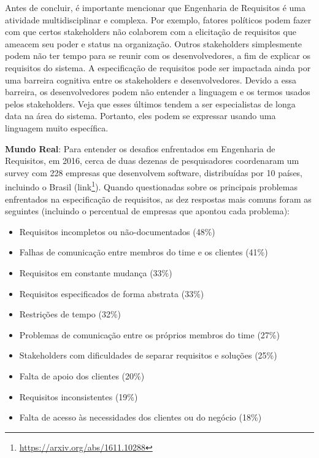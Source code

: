 \documentclass[
  11pt,
  twoside]{book}
\DeclareRobustCommand{\href}[2]{#2\footnote{\url{#1}}}
\newenvironment{esmbox}{\centering \vspace{1.5ex} \begin{tcolorbox}[breakable, colback=backcolor, width=4.9in]}{\end{tcolorbox} \vspace{1.5ex}}
\begin{document}
Antes de concluir, é importante mencionar que Engenharia de Requisitos é
uma atividade multidisciplinar e complexa. Por exemplo, fatores
políticos podem fazer com que certos stakeholders não colaborem com a
elicitação de requisitos que ameacem seu poder e status na organização.
Outros stakeholders simplesmente podem não ter tempo para se reunir com
os desenvolvedores, a fim de explicar os requisitos do sistema. A
especificação de requisitos pode ser impactada ainda por uma barreira
cognitiva entre os stakeholders e desenvolvedores. Devido a essa
barreira, os desenvolvedores podem não entender a linguagem e os termos
usados pelos stakeholders. Veja que esses últimos tendem a ser
especialistas de longa data na área do sistema. Portanto, eles podem se
expressar usando uma linguagem muito específica.

\begin{esmbox}

\textbf{Mundo Real}: Para entender os desafios enfrentados em Engenharia
de Requisitos, em 2016, cerca de duas dezenas de pesquisadores
coordenaram um survey com 228 empresas que desenvolvem software,
distribuídas por 10 países, incluindo o Brasil
(\href{https://arxiv.org/abs/1611.10288}{link}). Quando questionadas
sobre os principais problemas enfrentados na especificação de
requisitos, as dez respostas mais comuns foram as seguintes (incluindo o
percentual de empresas que apontou cada problema):

\begin{itemize}
\item
  Requisitos incompletos ou não-documentados (48\%)
\item
  Falhas de comunicação entre membros do time e os clientes (41\%)
\item
  Requisitos em constante mudança (33\%)
\item
  Requisitos especificados de forma abstrata (33\%)
\item
  Restrições de tempo (32\%)
\item
  Problemas de comunicação entre os próprios membros do time (27\%)
\item
  Stakeholders com dificuldades de separar requisitos e soluções (25\%)
\item
  Falta de apoio dos clientes (20\%)
\item
  Requisitos inconsistentes (19\%)
\item
  Falta de acesso às necessidades dos clientes ou do negócio (18\%)
\end{itemize}

\end{esmbox}
\end{document}
